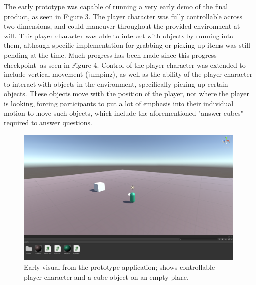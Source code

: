 \documentclass{vgtc}                          %
\begin{document}
The early prototype was capable of running a very early demo of the final product, as seen in Figure 3. The player character was fully controllable across two dimensions, and could maneuver throughout the provided environment at will. This player character was able to interact with objects by running into them, although specific implementation for grabbing or picking up items was still pending at the time. Much progress has been made since this progress checkpoint, as seen in Figure 4. Control of the player character was extended to include vertical movement (jumping), as well as the ability of the player character to interact with objects in the environment, specifically picking up certain objects. These objects move with the position of the player, not where the player is looking, forcing participants to put a lot of emphasis into their individual motion to move such objects, which include the aforementioned "answer cubes" required to answer questions.

\begin{figure}[tb]
 \centering 
 \includegraphics[width=\linewidth]{Prototype.png}
 \caption{Early visual from the prototype application; shows controllable-player character and a cube object on an empty plane.}
 \label{fig:sample}
\end{figure}
\end{document}
